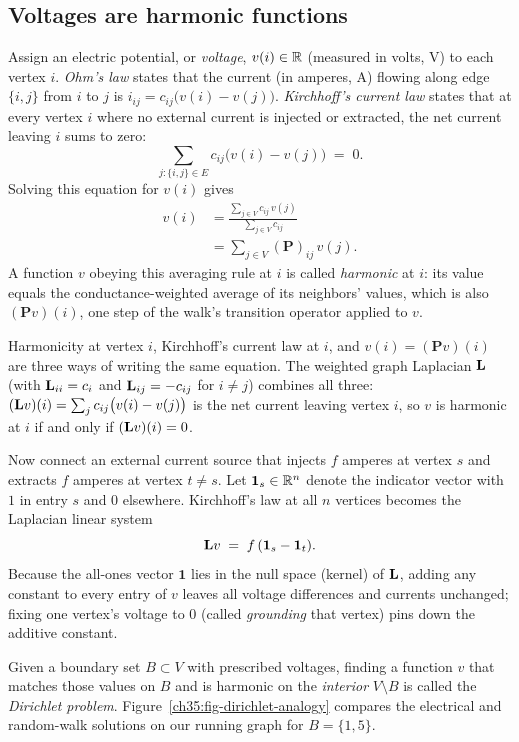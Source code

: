 \subsection{Voltages are harmonic functions}

Assign an electric potential, or \emph{voltage}, $v(i)\in\mathbb{R}$ (measured in volts, $\text{V}$) to each vertex $i$. \emph{Ohm's law} states that the current (in amperes, $\text{A}$) flowing along edge $\{i,j\}$ from $i$ to $j$ is $i_{ij}=c_{ij}\bigl(v(i)-v(j)\bigr)$. \emph{Kirchhoff's current law} states that at every vertex $i$ where no external current is injected or extracted, the net current leaving $i$ sums to zero:
\[
  \sum_{j:\{i,j\}\in E} c_{ij}\bigl(v(i)-v(j)\bigr) \;=\; 0.
\]
Solving this equation for $v(i)$ gives
\begin{align*}
  v(i) &= \frac{\sum_{j\in V} c_{ij}\,v(j)}{\sum_{j\in V} c_{ij}} \\
  &= \sum_{j\in V} (\mathbf{P})_{ij}\,v(j).
\end{align*}
A function $v$ obeying this averaging rule at $i$ is called \emph{harmonic} at $i$: its value equals the conductance-weighted average of its neighbors' values, which is also $(\mathbf{P}v)(i)$, one step of the walk's transition operator applied to $v$.

\begin{whybox}
Harmonicity at vertex $i$, Kirchhoff's current law at $i$, and $v(i)=(\mathbf{P}v)(i)$ are three ways of writing the same equation. The weighted graph Laplacian $\mathbf{L}$ (with $\mathbf{L}_{ii}=c_i$ and $\mathbf{L}_{ij}=-c_{ij}$ for $i\ne j$) combines all three: $(\mathbf{L} v)(i)=\sum_{j} c_{ij}\bigl(v(i)-v(j)\bigr)$ is the net current leaving vertex $i$, so $v$ is harmonic at $i$ if and only if $(\mathbf{L} v)(i)=0$.
\end{whybox}

Now connect an external current source that injects $f$ amperes at vertex $s$ and extracts $f$ amperes at vertex $t\ne s$. Let $\mathbf{1}_s \in \mathbb{R}^n$ denote the indicator vector with $1$ in entry $s$ and $0$ elsewhere. Kirchhoff's law at all $n$ vertices becomes the Laplacian linear system
\[
  \mathbf{L} v \;=\; f\,(\mathbf{1}_s-\mathbf{1}_t).
\]
Because the all-ones vector $\mathbf{1}$ lies in the null space (kernel) of $\mathbf{L}$, adding any constant to every entry of $v$ leaves all voltage differences and currents unchanged; fixing one vertex's voltage to $0$ (called \emph{grounding} that vertex) pins down the additive constant.

Given a boundary set $B\subset V$ with prescribed voltages, finding a function $v$ that matches those values on $B$ and is harmonic on the \emph{interior} $V\setminus B$ is called the \emph{Dirichlet problem}. Figure~\ref{ch35:fig-dirichlet-analogy} compares the electrical and random-walk solutions on our running graph for $B=\{1,5\}$.

